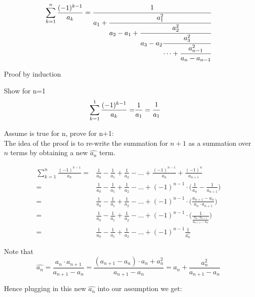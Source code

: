 \documentclass[a4paper]{article}
\begin{document}
    \begin{theorem}
        \label{relation_to_series}
        \[
        \sum_{k=1}^{n} \frac{(-1)^{k-1}}{a_k} = \cfrac{1}{a_1+\cfrac{a_{1}^{2}}{a_2 - a_1 +\cfrac{a_2^2}{a_3 - a_2
        \cfrac{a_3^2}{\cdots + \cfrac{a_{n-1}^2}{a_n - a_{n-1}}}}}}
        \]

        Proof by induction

        Show for n=1
        \begin{align*}
            \sum_{k=1}^{1} \frac{(-1)^{k-1}}{a_k} =& \frac{1}{a_1} = \cfrac{1}{a_1}
        \end{align*}

        Assume is true for n, prove for n+1:
        \\
        The idea of the proof is to re-write the summation for $n+1$ as a summation over $n$ terms by obtaining a new $\widehat{a_n}$ term.

        \begin{align*}
            \sum_{k=1}^{n} \frac{(-1)^{k-1}}{a_k} =& \frac{1}{a_0} - \frac{1}{a_1} + \frac{1}{a_2} - \dots + \frac{(-1)^{n-1}}{a_{n}} + \frac{(-1)^{n}}{a_{n+1}}
            \\
            =& \frac{1}{a_0} - \frac{1}{a_1} + \frac{1}{a_2} - \dots + (-1)^{n-1} \cdot \Big( \frac{1}{a_{n}} - \frac{1}{a_{n+1}} \Big)
            \\
            =& \frac{1}{a_0} - \frac{1}{a_1} + \frac{1}{a_2} - \dots + (-1)^{n-1} \cdot \Big( \frac{a_{n+1} - a_{n}}{a_{n}\cdot a_{n+1}} \Big)
            \\
            =& \frac{1}{a_0} - \frac{1}{a_1} + \frac{1}{a_2} - \dots + (-1)^{n-1} \cdot \Big( \frac{1}{\frac{a_{n}\cdot a_{n+1}}{a_{n+1} - a_{n}}}  \Big)
            \\
            =& \frac{1}{a_0} - \frac{1}{a_1} + \frac{1}{a_2} - \dots + (-1)^{n-1} \frac{1}{\widehat{a_n}}
        \end{align*}

        Note that
        \begin{equation*}
            \widehat{a_n}
            =
            \frac{a_{n}\cdot a_{n+1}}{a_{n+1} - a_{n}} =
            \frac{(a_{n+1} - a_n)\cdot a_{n} + a_n^2}{a_{n+1} - a_{n}} = a_{n} + \frac{a_n^2}{a_{n+1} - a_{n}}
        \end{equation*}

        Hence plugging in this new $\widehat{a_n}$ into our assumption we get:


\end{theorem}
\end{document}
